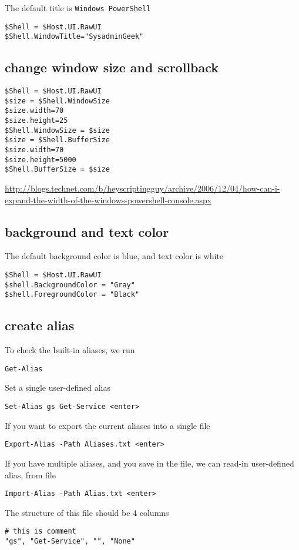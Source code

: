 The default title is \verb!Windows PowerShell!
\begin{verbatim}
$Shell = $Host.UI.RawUI
$Shell.WindowTitle="SysadminGeek"
\end{verbatim}

\subsection{change window size and scrollback}

\begin{verbatim}
$Shell = $Host.UI.RawUI
$size = $Shell.WindowSize
$size.width=70
$size.height=25
$Shell.WindowSize = $size
$size = $Shell.BufferSize
$size.width=70
$size.height=5000
$Shell.BufferSize = $size
\end{verbatim}

\url{http://blogs.technet.com/b/heyscriptingguy/archive/2006/12/04/how-can-i-expand-the-width-of-the-windows-powershell-console.aspx}


\subsection{background and text color}

The default background color is blue, and text color is white
\begin{verbatim}
$Shell = $Host.UI.RawUI
$shell.BackgroundColor = "Gray"
$shell.ForegroundColor = "Black"
\end{verbatim}


\subsection{create alias}

To check the built-in aliases, we run
\begin{verbatim}
Get-Alias
\end{verbatim}

Set a single user-defined alias
\begin{verbatim}
Set-Alias gs Get-Service <enter>
\end{verbatim}

If you want to export the current aliases into a single file
\begin{verbatim}
Export-Alias -Path Aliases.txt <enter>
\end{verbatim}

If you have multiple aliases, and you save in the file, we can read-in
user-defined alias, from file
\begin{verbatim}
Import-Alias -Path Alias.txt <enter>
\end{verbatim}
The structure of this file should be 4 columns
\begin{verbatim}
# this is comment
"gs", "Get-Service", "", "None"
\end{verbatim}


